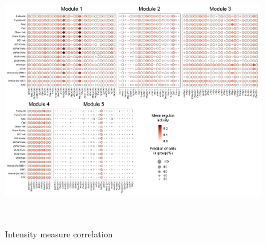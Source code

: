 \begin{figure}[H]
\centering
\includegraphics[width=\textwidth,height=11cm]{Appendix2/Fig/F3-15-01.png}
\caption{Intensity measure correlation}
\label{fig:IMs matrix correlation}
\end{figure}
